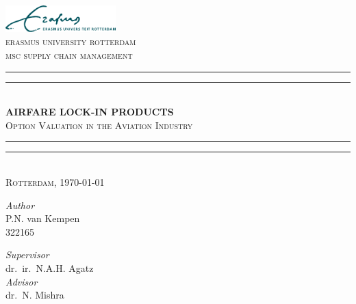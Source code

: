 \begin{titlingpage}
\begin{center}
\large

\vspace*{1.5cm}
\includegraphics[width=0.32\textwidth]{figures/EURlogo.pdf} \\[0.7\baselineskip]
\textsc{\Large erasmus university rotterdam\\
		msc supply chain management} \\[1.5\baselineskip]
 
\rule{\textwidth}{1.2pt}\vspace{-\baselineskip}\vspace{1.8pt}
\rule{\textwidth}{0.4pt} \\[2.6\baselineskip]

\textbf{\LARGE AIRFARE LOCK-IN PRODUCTS} \\[1.0\baselineskip]
\textsc{\Large Option Valuation in the Aviation Industry}\\[1.8\baselineskip]

\rule{\textwidth}{0.4pt}\vspace{-\baselineskip}\vspace{2.4pt}
\rule{\textwidth}{1.2pt} \\[2.25\baselineskip]

\textsc{Rotterdam, \today} \\[3.75\baselineskip]

\begin{minipage}[b]{0.4\textwidth}
	\flushleft
	\textsl{Author} \\[0.1\baselineskip]
	P.N. van Kempen \\
	322165
	\vfill
\end{minipage}
\begin{minipage}{0.4\textwidth}
	\flushright
	\textsl{Supervisor} \\[0.1\baselineskip]
	dr.~ir.~N.A.H. Agatz \\[1.2\baselineskip]

	\textsl{Advisor} \\[0.1\baselineskip]
	dr.~N. Mishra
\end{minipage}


\end{center}
\end{titlingpage}
